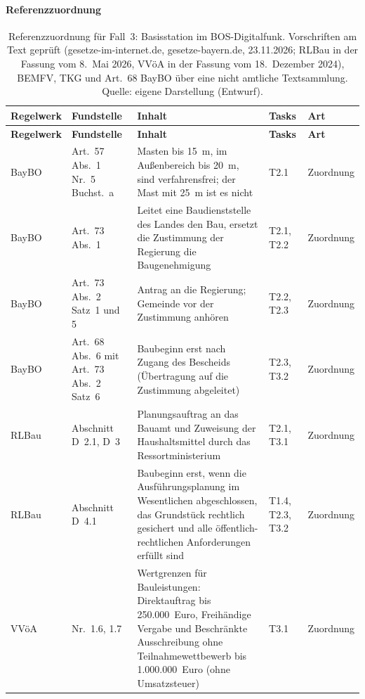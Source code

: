 \paragraph{Referenzzuordnung}
\begin{small}
\begin{longtable}{@{}>{\raggedright\arraybackslash}p{1.9cm}>{\raggedright\arraybackslash}p{2.4cm}>{\raggedright\arraybackslash}p{5.5cm}>{\raggedright\arraybackslash}p{2.4cm}>{\raggedright\arraybackslash}p{2.0cm}@{}}
\caption[Referenzzuordnung für Fall~3: Basisstation]{Referenzzuordnung für Fall~3: Basisstation im BOS-Digitalfunk. Vorschriften am Text geprüft (gesetze-im-internet.de, gesetze-bayern.de, 23.11.2026; RLBau in der Fassung vom 8.~Mai 2026, VVöA in der Fassung vom 18.~Dezember 2024), BEMFV, TKG und Art.~68 BayBO über eine nicht amtliche Textsammlung. Quelle: eigene Darstellung (Entwurf).}\label{tab:fall3_referenz}\\
\toprule \textbf{Regelwerk} & \textbf{Fundstelle} & \textbf{Inhalt} & \textbf{Tasks} & \textbf{Art} \\ \midrule \endfirsthead
\toprule \textbf{Regelwerk} & \textbf{Fundstelle} & \textbf{Inhalt} & \textbf{Tasks} & \textbf{Art} \\ \midrule \endhead
\bottomrule \endfoot
BayBO & Art.~57 Abs.~1 Nr.~5 Buchst.~a & Masten bis 15~m, im Außenbereich bis 20~m, sind verfahrensfrei; der Mast mit 25~m ist es nicht & T2.1 & Zuordnung \\
BayBO & Art.~73 Abs.~1 & Leitet eine Baudienststelle des Landes den Bau, ersetzt die Zustimmung der Regierung die Baugenehmigung & T2.1, T2.2 & Zuordnung \\
BayBO & Art.~73 Abs.~2 Satz~1 und 5 & Antrag an die Regierung; Gemeinde vor der Zustimmung anhören & T2.2, T2.3 & Zuordnung \\
BayBO & Art.~68 Abs.~6 mit Art.~73 Abs.~2 Satz~6 & Baubeginn erst nach Zugang des Bescheids (Übertragung auf die Zustimmung abgeleitet) & T2.3, T3.2 & Zuordnung \\
RLBau & Abschnitt D~2.1, D~3 & Planungsauftrag an das Bauamt und Zuweisung der Haushaltsmittel durch das Ressortministerium & T2.1, T3.1 & Zuordnung \\
RLBau & Abschnitt D~4.1 & Baubeginn erst, wenn die Ausführungsplanung im Wesentlichen abgeschlossen, das Grundstück rechtlich gesichert und alle öffentlich-rechtlichen Anforderungen erfüllt sind & T1.4, T2.3, T3.2 & Zuordnung \\
VVöA & Nr.~1.6, 1.7 & Wertgrenzen für Bauleistungen: Direktauftrag bis 250.000~Euro, Freihändige Vergabe und Beschränkte Ausschreibung ohne Teilnahmewettbewerb bis 1.000.000~Euro (ohne Umsatzsteuer) & T3.1 & Zuordnung \\

\end{longtable}
\end{small}
